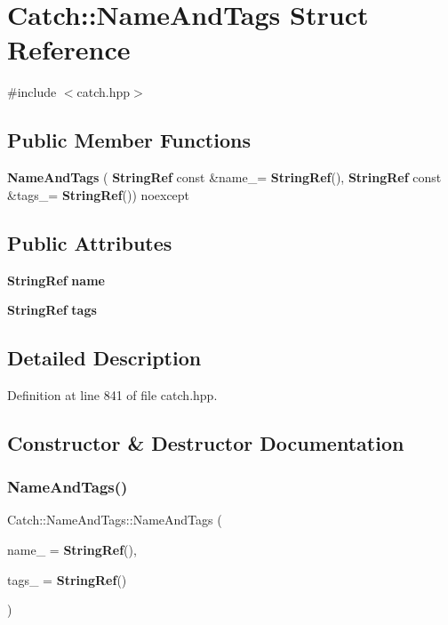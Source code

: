 \section{Catch\+::Name\+And\+Tags Struct Reference}
\label{struct_catch_1_1_name_and_tags}


{\ttfamily \#include $<$catch.\+hpp$>$}

\subsection*{Public Member Functions}
\begin{DoxyCompactItemize}
\item 
\textbf{ Name\+And\+Tags} (\textbf{ String\+Ref} const \&name\+\_\+=\textbf{ String\+Ref}(), \textbf{ String\+Ref} const \&tags\+\_\+=\textbf{ String\+Ref}()) noexcept
\end{DoxyCompactItemize}
\subsection*{Public Attributes}
\begin{DoxyCompactItemize}
\item 
\textbf{ String\+Ref} \textbf{ name}
\item 
\textbf{ String\+Ref} \textbf{ tags}
\end{DoxyCompactItemize}


\subsection{Detailed Description}


Definition at line 841 of file catch.\+hpp.



\subsection{Constructor \& Destructor Documentation}
\mbox{\label{struct_catch_1_1_name_and_tags_ab585111e615ce8c504a2b9630de8ee94}} 
\subsubsection{NameAndTags()}
{\footnotesize\ttfamily Catch\+::\+Name\+And\+Tags\+::\+Name\+And\+Tags (\begin{DoxyParamCaption}\item[{\textbf{ String\+Ref} const \&}]{name\+\_\+ = {\ttfamily \textbf{ String\+Ref}()},  }\item[{\textbf{ String\+Ref} const \&}]{tags\+\_\+ = {\ttfamily \textbf{ String\+Ref}()} }\end{DoxyParamCaption})\hspace{0.3cm}{\ttfamily [noexcept]}}



